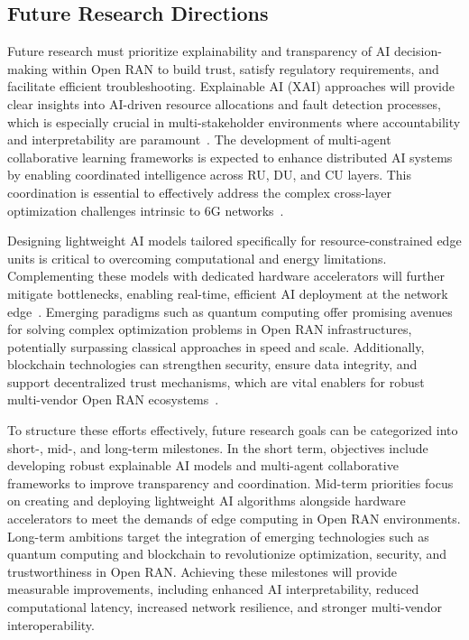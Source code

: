 \documentclass[sigconf]{acmart}
\begin{document}
\subsection{Future Research Directions}

Future research must prioritize explainability and transparency of AI decision-making within Open RAN to build trust, satisfy regulatory requirements, and facilitate efficient troubleshooting. Explainable AI (XAI) approaches will provide clear insights into AI-driven resource allocations and fault detection processes, which is especially crucial in multi-stakeholder environments where accountability and interpretability are paramount~\cite{ref54}. The development of multi-agent collaborative learning frameworks is expected to enhance distributed AI systems by enabling coordinated intelligence across RU, DU, and CU layers. This coordination is essential to effectively address the complex cross-layer optimization challenges intrinsic to 6G networks~\cite{ref48}.

Designing lightweight AI models tailored specifically for resource-constrained edge units is critical to overcoming computational and energy limitations. Complementing these models with dedicated hardware accelerators will further mitigate bottlenecks, enabling real-time, efficient AI deployment at the network edge~\cite{ref50}. Emerging paradigms such as quantum computing offer promising avenues for solving complex optimization problems in Open RAN infrastructures, potentially surpassing classical approaches in speed and scale. Additionally, blockchain technologies can strengthen security, ensure data integrity, and support decentralized trust mechanisms, which are vital enablers for robust multi-vendor Open RAN ecosystems~\cite{ref54}. 

To structure these efforts effectively, future research goals can be categorized into short-, mid-, and long-term milestones. In the short term, objectives include developing robust explainable AI models and multi-agent collaborative frameworks to improve transparency and coordination. Mid-term priorities focus on creating and deploying lightweight AI algorithms alongside hardware accelerators to meet the demands of edge computing in Open RAN environments. Long-term ambitions target the integration of emerging technologies such as quantum computing and blockchain to revolutionize optimization, security, and trustworthiness in Open RAN. Achieving these milestones will provide measurable improvements, including enhanced AI interpretability, reduced computational latency, increased network resilience, and stronger multi-vendor interoperability. 
\end{document}
